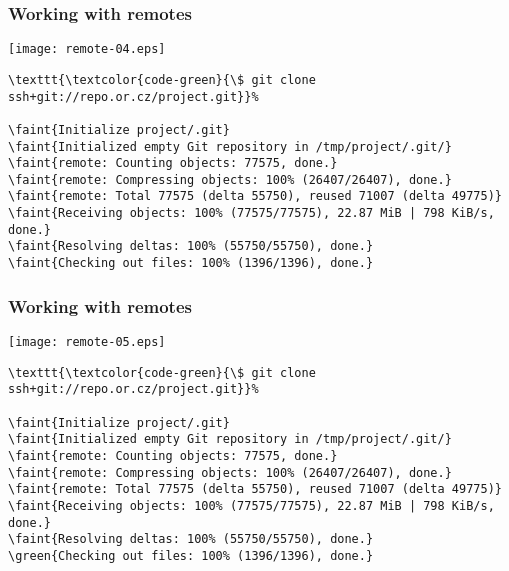 \documentclass[english]{beamer}
\newcommand{\CMD}[1]{%
\texttt{\textcolor{code-green}{#1}}%
}
\newcommand{\faint}[1]{%
\textcolor{code-gray}{#1}%
}
\newcommand{\green}[1]{%
\textcolor{code-green}{#1}%
}
\begin{document}
\begin{frame}[fragile]
\frametitle{Working with remotes}

\texttt{[image: remote-04.eps]}

{\tiny
\begin{Verbatim}[commandchars=\\\{\}]
\CMD{\$ git clone ssh+git://repo.or.cz/project.git}
\faint{Initialize project/.git}
\faint{Initialized empty Git repository in /tmp/project/.git/}
\faint{remote: Counting objects: 77575, done.}
\faint{remote: Compressing objects: 100% (26407/26407), done.}
\faint{remote: Total 77575 (delta 55750), reused 71007 (delta 49775)}
\faint{Receiving objects: 100% (77575/77575), 22.87 MiB | 798 KiB/s, done.}
\faint{Resolving deltas: 100% (55750/55750), done.}
\faint{Checking out files: 100% (1396/1396), done.}
\end{Verbatim}
}
\vspace{\textheight}
\end{frame}

\begin{frame}[fragile]
\frametitle{Working with remotes}

\texttt{[image: remote-05.eps]}

{\tiny
\begin{Verbatim}[commandchars=\\\{\}]
\CMD{\$ git clone ssh+git://repo.or.cz/project.git}
\faint{Initialize project/.git}
\faint{Initialized empty Git repository in /tmp/project/.git/}
\faint{remote: Counting objects: 77575, done.}
\faint{remote: Compressing objects: 100% (26407/26407), done.}
\faint{remote: Total 77575 (delta 55750), reused 71007 (delta 49775)}
\faint{Receiving objects: 100% (77575/77575), 22.87 MiB | 798 KiB/s, done.}
\faint{Resolving deltas: 100% (55750/55750), done.}
\green{Checking out files: 100% (1396/1396), done.}
\end{Verbatim}
}
\vspace{\textheight}
\end{frame}
\end{document}
